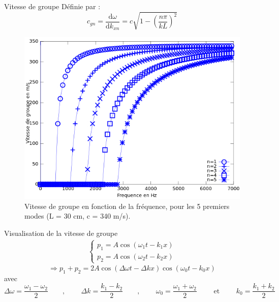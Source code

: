 \documentclass[xcolor=x11names,compress]{beamer}
\renewcommand{\(}{\begin{columns}}
\renewcommand{\)}{\end{columns}}
\newcommand{\<}[1]{\begin{column}{#1}}
\renewcommand{\>}{\end{column}}
\begin{document}
\begin{frame}{Vitesse de groupe}
Définie par : 
	\begin{equation}
		c_{gn} = \frac{\mathrm{d}\omega}{\mathrm{d}k_{xn}} = c\sqrt{1-\left(\frac{n\pi}{kL}\right)^{2}}
	\end{equation}
	\bigskip
	\begin{figure}
		\includegraphics[scale=0.35]{./figures/c_groupe.jpg}
		\caption*{\scriptsize Vitesse de groupe en fonction de la fréquence, pour les 5 premiers modes (L = 30 cm, c = 340 m/s).}
	\end{figure}

\end{frame}


\begin{frame}{Visualisation de la vitesse de groupe}
	\begin{eqnarray*}
		\begin{cases}
			p_1 = A\cos(\omega_1t-k_1x) \\
			p_2 = A\cos(\omega_2t-k_2x)
		\end{cases}  
	\end{eqnarray*}
	\bigskip
	\begin{equation}
		 \Rightarrow  p_1+p_2 =2A\cos\left(\Delta \omega t-\Delta kx\right)\cos\left(\omega_0 t-k_0x\right)
	\end{equation}
	\bigskip
avec
\scriptsize
\begin{equation*}
\Delta \omega = \frac{\omega_1-\omega_2}{2} \qquad \text{,~} \qquad \Delta k = \frac{k_1-k_2}{2} \qquad \text{,~} \qquad  \omega_0 = \frac{\omega_1+\omega_2}{2} \qquad \text{ et } \qquad  k_0 = \frac{k_1+k_2}{2}
\end{equation*}

\begin{center}
\bigskip
\bigskip
\end{center} 
\end{frame}
\end{document}
